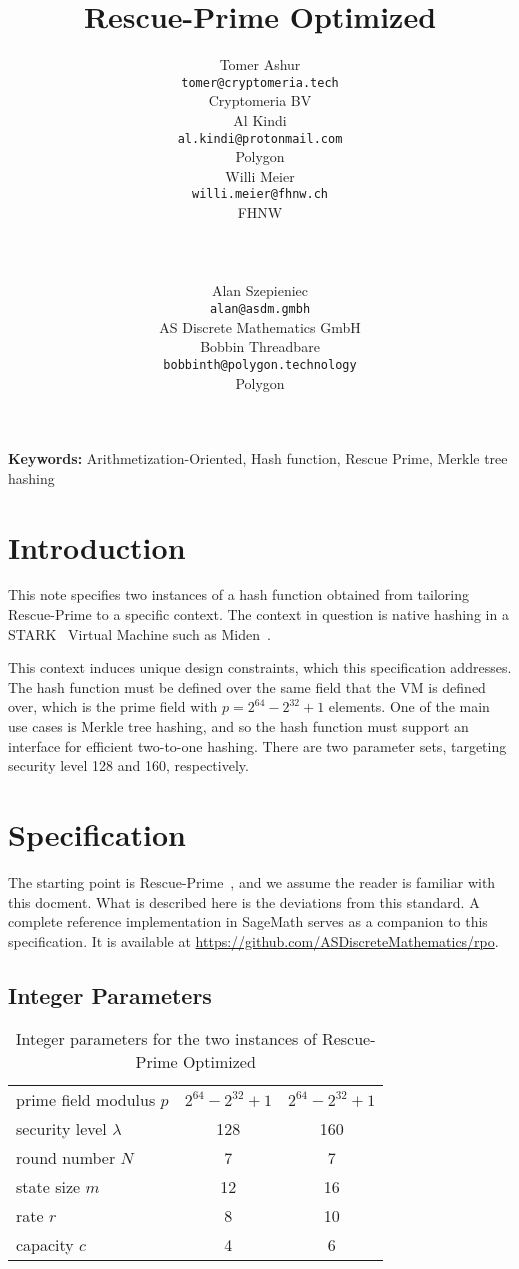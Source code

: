 \documentclass[a4paper]{article}
\title{Rescue-Prime Optimized}
\author{
\begin{tabular}{c}Tomer Ashur \\ \small \texttt{tomer@cryptomeria.tech} \\ \small Cryptomeria BV \end{tabular}
\begin{tabular}{c}Al Kindi \\ \small \texttt{al.kindi@protonmail.com} \\ \small Polygon \end{tabular}
\begin{tabular}{c}Willi Meier \\ \small \texttt{willi.meier@fhnw.ch} \\ \small FHNW \end{tabular} \\ \\
\begin{tabular}{c}Alan Szepieniec \\ \small \texttt{alan@asdm.gmbh} \\ \small AS Discrete Mathematics GmbH \end{tabular}
\begin{tabular}{c}Bobbin Threadbare \\ \small \texttt{bobbinth@polygon.technology} \\ \small Polygon \end{tabular} 
}
\begin{document}
\maketitle

\textbf{Keywords:} Arithmetization-Oriented, Hash function, Rescue Prime, Merkle tree hashing

\section{Introduction}
\label{section:intro}

This note specifies two instances of a hash function obtained from tailoring Rescue-Prime to a specific context. The context in question is native hashing in a STARK~\cite{cryptoeprint:2018/046} Virtual Machine such as Miden~\cite{miden}.

This context induces unique design constraints, which this specification addresses. The hash function must be defined over the same field that the VM is defined over, which is the prime field with  $p = 2^{64} - 2^{32} + 1$ elements. One of the main use cases is Merkle tree hashing, and so the hash function must support an interface for efficient two-to-one hashing. There are two parameter sets, targeting security level 128 and 160, respectively. 

\section{Specification}

The starting point is Rescue-Prime~\cite{cryptoeprint:2020/1143}, and we assume the reader is familiar with this docment. What is described here is the deviations from this standard. A complete reference implementation in SageMath serves as a companion to this specification. It is available at \url{https://github.com/ASDiscreteMathematics/rpo}.

\subsection{Integer Parameters}

\begin{table}[!htp]
\centering
\caption{Integer parameters for the two instances of Rescue-Prime Optimized}
\label{table:integer-parameters}

\begin{tabular}{l||c|c}
prime field modulus $p$ & $2^{64} - 2^{32} + 1$ & $2^{64} - 2^{32} + 1$ \\
security level $\lambda$ & 128 & 160 \\
round number $N$ & 7 & 7 \\
state size $m$ & 12 & 16 \\
rate $r$ & 8 & 10 \\
capacity $c$ & 4 & 6 \\
\end{tabular}
\end{table}
\end{document}
